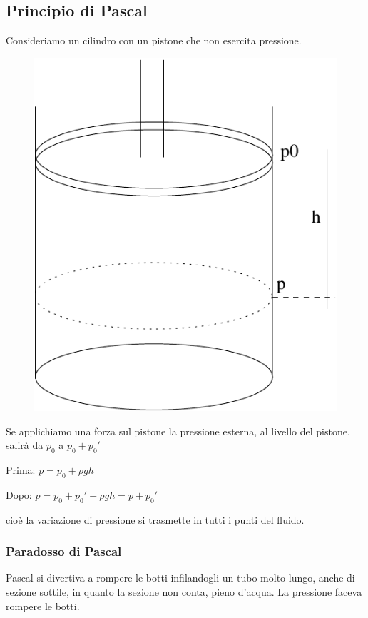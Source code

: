 \subsection{Principio di Pascal}
Consideriamo un cilindro con un pistone che non esercita pressione.

\begin{figure}[htbp]
\centering
\includegraphics[scale=0.5]{immagini/fisica1/Pascal1}
\end{figure}

Se applichiamo una forza sul pistone la pressione esterna, al livello del pistone, salirà da $p_0$ a $p_0+p_0'$

Prima: $p=p_0+\rho gh$

Dopo: $p=p_0+p_0'+\rho gh=p+p_0'$

cioè la variazione di pressione si trasmette in tutti i punti del fluido.
\subsubsection{Paradosso di Pascal}
Pascal si divertiva a rompere le botti infilandogli un tubo molto lungo, anche di sezione sottile, in quanto la sezione non conta, pieno d'acqua. La pressione faceva rompere le botti.


